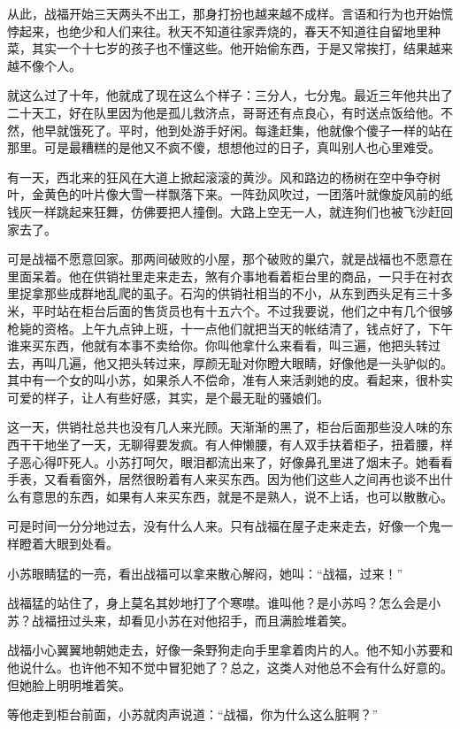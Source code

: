 从此，战福开始三天两头不出工，那身打扮也越来越不成样。言语和行为也开始慌悖起来，也绝少和人们来往。秋天不知道往家弄烧的，春天不知道往自留地里种菜，其实一个十七岁的孩子也不懂这些。他开始偷东西，于是又常挨打，结果越来越不像个人。 

就这么过了十年，他就成了现在这么个样子：三分人，七分鬼。最近三年他共出了二十天工，好在队里因为他是孤儿救济点，哥哥还有点良心，有时送点饭给他。不然，他早就饿死了。平时，他到处游手好闲。每逢赶集，他就像个傻子一样的站在那里。可是最糟糕的是他又不疯不傻，想想他过的日子，真叫别人也心里难受。 

有一天，西北来的狂风在大道上掀起滚滚的黄沙。风和路边的杨树在空中争夺树叶，金黄色的叶片像大雪一样飘落下来。一阵劲风吹过，一团落叶就像旋风前的纸钱灰一样跳起来狂舞，仿佛要把人撞倒。大路上空无一人，就连狗们也被飞沙赶回家去了。 

可是战福不愿意回家。那两间破败的小屋，那个破败的巢穴，就是战福也不愿意在里面呆着。他在供销社里走来走去，煞有介事地看着柜台里的商品，一只手在衬衣里捉拿那些成群地乱爬的虱子。石沟的供销社相当的不小，从东到西头足有三十多米，平时站在柜台后面的售货员也有十五六个。不过我要说，他们之中有几个很够枪毙的资格。上午九点钟上班，十一点他们就把当天的帐结清了，钱点好了，下午谁来买东西，他就有本事不卖给你。你叫他拿什么来看看，叫三遍，他把头转过去，再叫几遍，他又把头转过来，厚颜无耻对你瞪大眼睛，好像他是一头驴似的。其中有一个女的叫小苏，如果杀人不偿命，准有人来活剥她的皮。看起来，很朴实可爱的样子，让人有些好感，其实，是个最无耻的骚娘们。 

这一天，供销社总共也没有几人来光顾。天渐渐的黑了，柜台后面那些没人味的东西干干地坐了一天，无聊得要发疯。有人伸懒腰，有人双手扶着柜子，扭着腰，样子恶心得吓死人。小苏打呵欠，眼泪都流出来了，好像鼻孔里进了烟末子。她看看手表，又看看窗外，居然很盼着有人来买东西。因为他们这些人之间再也谈不出什么有意思的东西，如果有人来买东西，就是不是熟人，说不上话，也可以散散心。 

可是时间一分分地过去，没有什么人来。只有战福在屋子走来走去，好像一个鬼一样瞪着大眼到处看。 

小苏眼睛猛的一亮，看出战福可以拿来散心解闷，她叫：“战福，过来！” 

战福猛的站住了，身上莫名其妙地打了个寒噤。谁叫他？是小苏吗？怎么会是小苏？战福扭过头来，却看见小苏在对他招手，而且满脸堆着笑。 

战福小心翼翼地朝她走去，好像一条野狗走向手里拿着肉片的人。他不知小苏要和他说什么。也许他不知不觉中冒犯她了？总之，这类人对他总不会有什么好意的。但她脸上明明堆着笑。 

等他走到柜台前面，小苏就肉声说道：“战福，你为什么这么脏啊？” 

